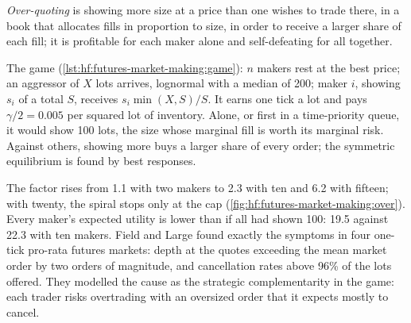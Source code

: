 \begin{definition}\label{def:hf:futures-market-making:over}
\emph{Over-quoting} is showing more size at a price than one wishes to trade there, in a book that allocates fills in
proportion to size, in order to receive a larger share of each fill; it is profitable for each maker alone and self-defeating for all together.
\end{definition}

The game (\cref{lst:hf:futures-market-making:game}): $n$ makers rest at the best price; an aggressor of $X$ lots arrives, lognormal with a median of
200; maker $i$, showing $s_i$ of a total $S$, receives $s_i\min(X,S)/S$. It earns one tick a lot and pays $\gamma/2=0.005$ per squared lot of
inventory. Alone, or first in a time-priority queue, it would show 100 lots, the size whose marginal fill is worth its marginal risk. Against others,
showing more buys a larger share of every order; the symmetric equilibrium is found by best responses.

\begin{omfigure}

\label{fig:hf:futures-market-making:over}
\end{omfigure}

The factor rises from 1.1 with two makers to 2.3 with ten and 6.2 with fifteen; with twenty, the spiral stops only at the cap
(\cref{fig:hf:futures-market-making:over}). Every maker's expected utility is lower than if all had shown 100: 19.5 against 22.3 with ten makers.
Field and Large found exactly the symptoms in four one-tick pro-rata futures markets: depth at the quotes exceeding the mean market order by two orders
of magnitude, and cancellation rates above 96\% of the lots offered. They modelled the cause as the strategic complementarity in the game: each
trader risks overtrading with an oversized order that it expects mostly to cancel.

